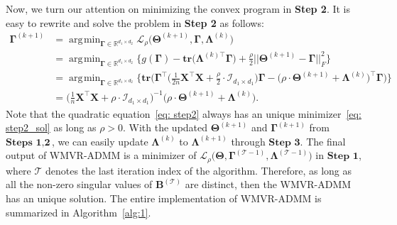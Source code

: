 \documentclass[alpha-refs]{wiley-article}
\DeclareMathOperator*{\argmin}{\arg\!\min}
\begin{document}
Now, we turn our attention on minimizing the convex program in \textbf{Step 2}.
It is easy to rewrite and solve the problem in \textbf{Step 2} as follows:
\begin{align}
    \boldsymbol{\Gamma}^{(k+1)}
    &= \argmin_{\boldsymbol{\Gamma}\in\mathbb{R}^{d_{1} \times d_{2}}} \mathcal{L}_{\rho} \big( \boldsymbol{\Theta}^{(k+1)},\boldsymbol{\Gamma},\boldsymbol{\Lambda}^{(k)} \big) \nonumber \\
    &= \argmin_{\boldsymbol{\Gamma}\in\mathbb{R}^{d_{1} \times d_{2}}} \bigg\{ g(\boldsymbol{\Gamma}) - \textbf{tr}\big( \boldsymbol{\Lambda}^{(k)\top}\boldsymbol{\Gamma}\big) + \frac{\rho}{2} || \boldsymbol{\Theta}^{(k+1)}-\boldsymbol{\Gamma} ||_{F}^{2} \bigg\} \nonumber  \\
    &= \argmin_{\boldsymbol{\Gamma}\in\mathbb{R}^{d_{1} \times d_{2}}} \bigg\{ \textbf{tr} \bigg( \boldsymbol{\Gamma}^{\top}\bigg(\frac{1}{2n}\boldsymbol{X}^{\top}\boldsymbol{X} + \frac{\rho}{2} \cdot \mathcal{I}_{d_{1} \times d_{1}} \bigg) \boldsymbol{\Gamma} - \big( \rho \cdot \boldsymbol{\Theta}^{(k+1)} + \boldsymbol{\Lambda}^{(k)} \big)^{\top} \boldsymbol{\Gamma} \bigg) \bigg\} \label{eq: step2} \\
    &= \bigg( \frac{1}{n}\boldsymbol{X}^{\top}\boldsymbol{X}+\rho\cdot\mathcal{I}_{d_{1} \times d_{1}} \bigg)^{-1}\big( \rho \cdot \boldsymbol{\Theta}^{(k+1)} + \boldsymbol{\Lambda}^{(k)} \big). \label{eq: step2_sol}
\end{align}
Note that the quadratic equation~\eqref{eq: step2} always has an unique minimizer~\eqref{eq: step2_sol} as long as $\rho>0$.
With the updated $\boldsymbol{\Theta}^{(k+1)}$ and $\boldsymbol{\Gamma}^{(k+1)}$ from $\textbf{Steps 1}, \textbf{2}$, we can easily update $\boldsymbol{\Lambda}^{(k)}$ to $\boldsymbol{\Lambda}^{(k+1)}$ through $\textbf{Step 3}$.
The final output of WMVR-ADMM is a minimizer of $\mathcal{L}_{\rho} \big( \boldsymbol{\Theta},\boldsymbol{\Gamma}^{(\mathcal{T}-1)},\boldsymbol{\Lambda}^{(\mathcal{T}-1)}\big)$ in $\textbf{Step 1}$, where $\mathcal{T}$ denotes the last iteration index of the algorithm.
Therefore, as long as all the non-zero singular values of $\boldsymbol{B}^{(\mathcal{T})}$ are distinct, then the WMVR-ADMM has an unique solution.
The entire implementation of WMVR-ADMM is summarized in Algorithm~\ref{alg:1}.
\end{document}
